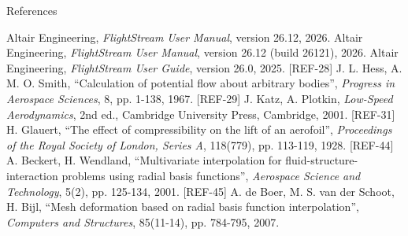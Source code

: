 \documentclass[aspectratio=169,11pt]{beamer}
\begin{document}
\begin{frame}{References}
\begin{reflist}
   
   \recordsref
   Altair Engineering, \emph{FlightStream User Manual}, version 26.12, 2026.
   Altair Engineering, \emph{FlightStream User Manual}, version 26.12 (build 26121), 2026.
   Altair Engineering, \emph{FlightStream User Guide}, version 26.0, 2025.
   [REF-28] J. L. Hess, A. M. O. Smith, ``Calculation of potential flow about
        arbitrary bodies'', \emph{Progress in Aerospace Sciences}, 8,
        pp. 1-138, 1967.
   [REF-29] J. Katz, A. Plotkin, \emph{Low-Speed Aerodynamics}, 2nd ed.,
        Cambridge University Press, Cambridge, 2001.
   [REF-31] H. Glauert, ``The effect of compressibility on the lift of an
        aerofoil'', \emph{Proceedings of the Royal Society of London, Series
        A}, 118(779), pp. 113-119, 1928.
   [REF-44] A. Beckert, H. Wendland, ``Multivariate interpolation for
        fluid-structure-interaction problems using radial basis functions'',
        \emph{Aerospace Science and Technology}, 5(2), pp. 125-134, 2001.
   [REF-45] A. de Boer, M. S. van der Schoot, H. Bijl, ``Mesh deformation based
        on radial basis function interpolation'', \emph{Computers and
        Structures}, 85(11-14), pp. 784-795, 2007.
\end{reflist}
\end{frame}
\end{document}
